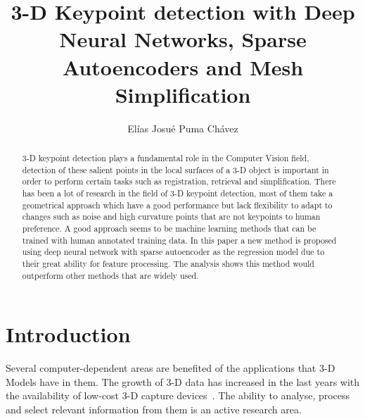 \documentclass{comjnl}
\begin{document}
\title[3-D Keypoint detection with DNNs]{3-D Keypoint detection with Deep Neural Networks,
Sparse Autoencoders and Mesh Simplification}
\author{El\'{i}as Josu\'{e} Puma Ch\'{a}vez}






\begin{abstract}
3-D keypoint detection plays a fundamental role in the Computer Vision field, detection
of these salient points in the local surfaces of a 3-D object is important in order to 
perform certain tasks such as registration, retrieval and simplification. There has been
a lot of research in the field of 3-D keypoint detection, most of them take a geometrical 
approach which have a good performance but lack flexibility to adapt to changes such as
noise and high curvature points that are not keypoints to human preference. A good
approach seems to be machine learning methods that can be trained with human annotated 
training data. In this paper a new method is proposed using deep neural network with 
sparse autoencoder as the regression model due to their great ability for feature processing. 
The analysis shows this method would outperform other methods that are widely used. 
\end{abstract}

\maketitle


\section{Introduction}
Several computer-dependent areas are benefited of the applications
that 3-D Models have in them. The growth of 3-D data has increased in
the last years with the availability of low-cost 3-D capture devices~\cite{Sipiran2011}.
The ability to analyse, process and select relevant information
from them is an active research area. 
\end{document}
